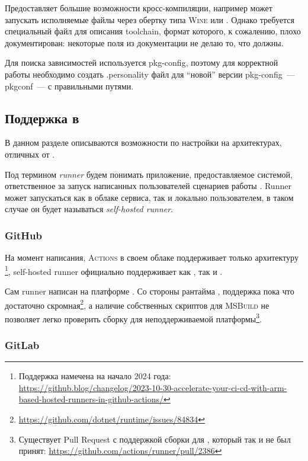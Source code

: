 Предоставляет большие возможности кросс-компиляции, например может запускать исполняемые файлы через обертку типа \textsc{Wine} или \qemu{}.
Однако требуется специальный файл для описания toolchain, формат которого, к сожалению, плохо документирован: некоторые поля из документации не делаю то, что должны.

Для поиска зависимостей используется pkg-config, поэтому для корректной работы необходимо создать .personality файл для \enquote{новой} версии pkg-config~--- pkgconf~--- с правильными путями.

\subsection{Поддержка в \ci{}}

В данном разделе описываются возможности по настройки \ci{} на архитектурах, отличных от \amd{}.

\begin{definition}[Runner]
	Под термином \textit{runner} будем понимать приложение, предоставляемое \ci{} системой, ответственное за запуск написанных пользователей сценариев работы \ci{}.
	Runner может запускаться как в облаке \ci{} сервиса, так и локально пользователем, в таком случае он будет называться \textit{self-hosted runner}.
\end{definition}

\subsubsection{GitHub}

На момент написания, \GitHub{} \textsc{Actions} в своем облаке поддерживает только архитектуру \amd{}\footnote{Поддержка \arm{} намечена на начало 2024 года: \url{https://github.blog/changelog/2023-10-30-accelerate-your-ci-cd-with-arm-based-hosted-runners-in-github-actions/}}, self-hosted runner официально поддерживает как \amd{}, так и \arm{}.

Сам runner написан на платформе \dotnet{}.
Со стороны рантайма \dotnet{}, поддержка \riscv{} пока что достаточно скромная\footnote{\url{https://github.com/dotnet/runtime/issues/84834}}, а наличие собственных скриптов для \textsc{MSBuild} не позволяет легко проверить сборку для неподдерживаемой платформы\footnote{Существует Pull Request с поддержкой сборки для \power{}, который так и не был принят: \url{https://github.com/actions/runner/pull/2386}}.

\subsubsection{GitLab}

